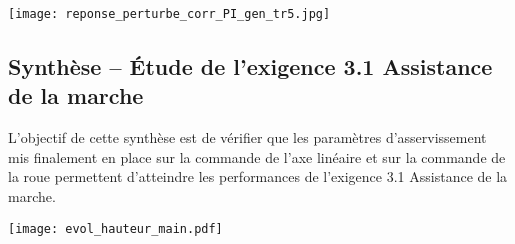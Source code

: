 \begin{multicols}{2}
\begin{corrige}
\begin{center}
      \texttt{[image: reponse\_perturbe\_corr\_PI\_gen\_tr5.jpg]}
\end{center}
\end{corrige}
\fi

\ifprof
\else
%
%
%
%
%
%
%
%
\fi


\subsection*{Synthèse -- Étude de l'exigence 3.1 \og Assistance de la marche\fg{}}
\ifprof
\else
L'objectif de cette synthèse est de vérifier que les paramètres d'asservissement mis finalement en place sur la commande de l'axe linéaire et sur la commande de la roue permettent d'atteindre les performances de l'exigence 3.1 \og Assistance de la marche\fg{}.

\begin{center}%
\texttt{[image: evol\_hauteur\_main.pdf]}
\end{center}


\end{multicols}
